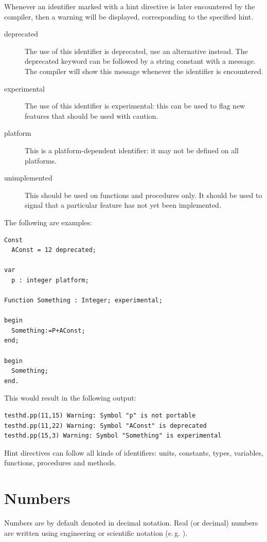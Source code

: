 
Whenever an identifier marked with a hint directive is  later encountered by
the compiler, then a warning will be displayed, corresponding to the
specified hint.
\begin{description}
\item[deprecated] The use of this identifier is deprecated, use an
alternative instead. The deprecated keyword can be followed by a string
constant with a message. The compiler will show this message whenever the
identifier is encountered. 
\item[experimental] The use of this identifier is experimental: this can be
used to flag new features that should be used with caution.
\item[platform] This is a platform-dependent identifier: it may not be
defined on all platforms. 
\item[unimplemented] This should be used on functions and procedures only.
It should be used to signal that a particular feature has not yet been
implemented. 
\end{description}

The following are examples:
\begin{verbatim}
Const
  AConst = 12 deprecated;

var
  p : integer platform;

Function Something : Integer; experimental;

begin
  Something:=P+AConst;
end;

begin
  Something;
end.
\end{verbatim}
This would result in the following output:
\begin{verbatim}
testhd.pp(11,15) Warning: Symbol "p" is not portable
testhd.pp(11,22) Warning: Symbol "AConst" is deprecated
testhd.pp(15,3) Warning: Symbol "Something" is experimental
\end{verbatim}

Hint directives can follow all kinds of identifiers:
units, constants, types, variables, functions, procedures and methods.

\section{Numbers}
Numbers are by default denoted in decimal notation.
Real (or decimal) numbers are written using engineering or scientific
notation (e.\,g. ).

